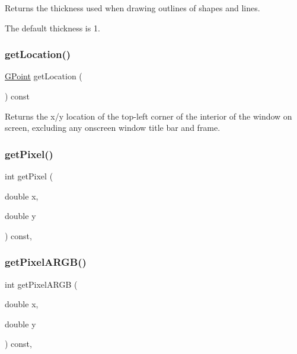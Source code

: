 Returns the thickness used when drawing outlines of shapes and lines. 

The default thickness is 1. \mbox{\label{classGWindow_a4f83802015511edeb63b892830812c11}} 
\subsubsection{\texorpdfstring{get\+Location()}{getLocation()}}
{\footnotesize\ttfamily \mbox{\hyperlink{structGPoint}{G\+Point}} get\+Location (\begin{DoxyParamCaption}{ }\end{DoxyParamCaption}) const\hspace{0.3cm}{\ttfamily [virtual]}}



Returns the x/y location of the top-\/left corner of the interior of the window on screen, excluding any onscreen window title bar and frame. 

\mbox{\label{classGForwardDrawingSurface_a342aaa6de62a4a324a2e4f3921db1d3e}} 
\subsubsection{\texorpdfstring{get\+Pixel()}{getPixel()}}
{\footnotesize\ttfamily int get\+Pixel (\begin{DoxyParamCaption}\item[{double}]{x,  }\item[{double}]{y }\end{DoxyParamCaption}) const\hspace{0.3cm}{\ttfamily [override]}, {\ttfamily [inherited]}}

\mbox{\label{classGForwardDrawingSurface_ae28117ec01d58208d381fba886030850}} 
\subsubsection{\texorpdfstring{get\+Pixel\+A\+R\+G\+B()}{getPixelARGB()}}
{\footnotesize\ttfamily int get\+Pixel\+A\+R\+GB (\begin{DoxyParamCaption}\item[{double}]{x,  }\item[{double}]{y }\end{DoxyParamCaption}) const\hspace{0.3cm}{\ttfamily [override]}, {\ttfamily [inherited]}}

